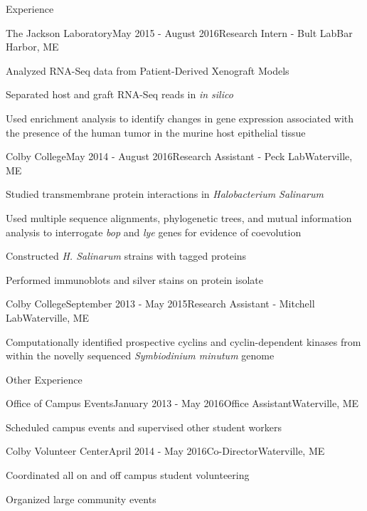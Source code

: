\documentclass{resume}
\begin{document}
	\begin{rSection}{Experience}
		
		\begin{rSubsection}{The Jackson Laboratory}{May 2015 - August 2016}{Research Intern - Bult Lab}{Bar Harbor, ME}
			\item Analyzed RNA-Seq data from Patient-Derived Xenograft Models
			\item Separated host and graft RNA-Seq reads in \textit{in silico}
			\item Used enrichment analysis to identify changes in gene expression associated with the presence of the human tumor in the murine host epithelial tissue
		\end{rSubsection}
		
		\begin{rSubsection}{Colby College}{May 2014 - August 2016}{Research Assistant - Peck Lab}{Waterville, ME}
			\item Studied transmembrane protein interactions in \textit{Halobacterium Salinarum}
			\item Used multiple sequence alignments, phylogenetic trees, and mutual information analysis to interrogate \textit{bop} and \textit{lye} genes for evidence of coevolution
			\item Constructed \textit{H. Salinarum} strains with tagged proteins
			\item Performed immunoblots and silver stains on protein isolate
		\end{rSubsection}
		
		\begin{rSubsection}{Colby College}{September 2013 - May 2015}{Research Assistant - Mitchell Lab}{Waterville, ME}
			\item Computationally identified prospective cyclins and cyclin-dependent kinases from within the novelly sequenced \textit{Symbiodinium minutum} genome
		\end{rSubsection}
		
	\end{rSection}
	
	\begin{rSection}{Other Experience}
		
		\begin{rSubsection}{Office of Campus Events}{January 2013 - May 2016}{Office Assistant}{Waterville, ME}
			\item Scheduled campus events and supervised other student workers
		\end{rSubsection}
		\begin{rSubsection}{Colby Volunteer Center}{April 2014 - May 2016}{Co-Director}{Waterville, ME}
			\item Coordinated all on and off campus student volunteering
			\item Organized large community events
		\end{rSubsection}
		
	\end{rSection}
	
\end{document}
